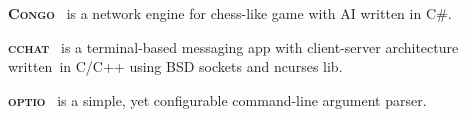 
\vspace{1.0em}

\textsc{\textbf{Congo}} \textsuperscript{\href{https://github.com/zhukovdm/Congo}{\faExternalLink}}
~is a network engine for chess-like game with AI written in C\#.

\vspace{0.7em}

\textsc{\textbf{cchat}} \textsuperscript{\href{https://github.com/zhukovdm/cchat}{\faExternalLink}}
~is a terminal-based messaging app with client-server architecture written~in
C/C++ using BSD sockets and \textsf{ncurses} lib.

\vspace{0.7em}

\textsc{\textbf{optio}} \textsuperscript{\href{https://github.com/zhukovdm/optio}{\faExternalLink}}
~is a simple, yet configurable command-line argument parser.

\vspace{1.0em}
